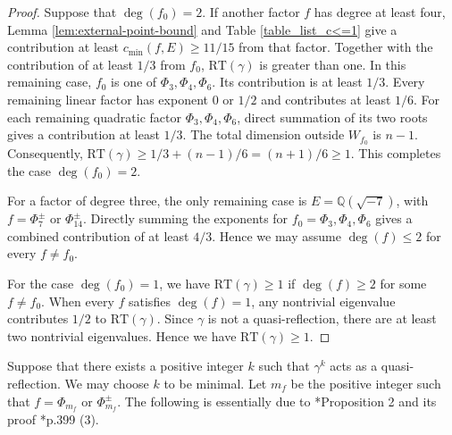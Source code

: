 \documentclass[11pt]{amsart}
\theoremstyle{plain}
\theoremstyle{definition}
\numberwithin{equation}{section}
\newcommand{\bbQ}{\mathbb{Q}}
\begin{document}
\begin{proof}
Suppose that $\deg(f_0)=2$.
If another factor $f$ has degree at least
four, Lemma \ref{lem:external-point-bound}
and Table \ref{table_list_c<=1} give a
contribution at least
$c_{\min}(f,E)\geq11/15$ from that factor.
Together with the contribution of at
least $1/3$ from $f_0$, $\mathrm{RT}(\gamma)$ is greater
than one.
In this remaining case, $f_0$ is one of
$\Phi_3,\Phi_4,\Phi_6$.
Its contribution is at least $1/3$.
Every remaining linear factor has exponent $0$ or $1/2$
and contributes at least $1/6$.
For each remaining quadratic factor
$\Phi_3,\Phi_4,\Phi_6$, direct summation of its two
roots gives a contribution at least $1/3$.
The total dimension outside $W_{f_0}$ is $n-1$.
Consequently,
$\mathrm{RT}(\gamma)\geq1/3+(n-1)/6=(n+1)/6\geq1$.
This completes the case $\deg(f_0)=2$.

For a factor of degree three, the only
remaining case is $E=\bbQ(\sqrt{-7})$,
with $f=\Phi_7^\pm$ or $\Phi_{14}^\pm$.
Directly summing the exponents for
$f_0=\Phi_3,\Phi_4,\Phi_6$ gives a
combined contribution of at least $4/3$.
Hence we may assume $\deg(f)\leq2$
for every $f\neq f_0$.


For the case $\deg(f_0) = 1$, we have $\mathrm{RT}(\gamma) \geq 1$ if $\deg(f) \geq 2$ for some $f \neq f_0$.
When every $f$ satisfies $\deg(f)=1$, any nontrivial eigenvalue contributes $1/2$ to $\mathrm{RT}(\gamma)$.
Since $\gamma$ is not a quasi-reflection, there are at least two nontrivial eigenvalues.
Hence we have $\mathrm{RT}(\gamma) \geq 1$.
\end{proof}

Suppose that there exists a positive integer $k$ such that $\gamma^k$ acts as a quasi-reflection.
We may choose $k$ to be minimal.
Let $m_f$ be the positive integer such that $f = \Phi_{m_f}$ or $\Phi_{m_f}^\pm$.
The following is essentially due to \cite{behrens2012singularities}*{Proposition 2} and its proof \cite{behrens2012singularities}*{p.399 (3)}.
\end{document}
